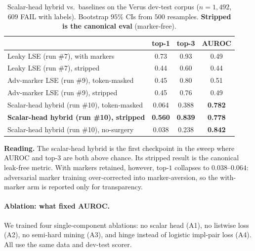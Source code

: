 \documentclass[10pt]{article}
\begin{document}
\begin{table}[htbp]
\centering
\caption{Scalar-head hybrid vs.\ baselines on the Verus dev-test corpus
($n{=}1{,}492$, $609$ FAIL with labels). Bootstrap $95\%$ CIs from
$500$ resamples. \textbf{Stripped is the canonical eval} (marker-free).}
\label{tab:run10-real-bug}
\small
\begin{tabular}{lccc}
\toprule
                                  & top-1            & top-3            & AUROC          \\
\midrule
Leaky LSE (run \#7), with markers   & 0.73             & 0.93             & 0.49           \\
Leaky LSE (run \#7), stripped      & 0.44             & 0.60             & 0.44           \\
Adv-marker LSE (run \#9), token-masked              & 0.45             & 0.80             & 0.51           \\
Adv-marker LSE (run \#9), stripped                  & 0.45             & 0.76             & 0.49           \\
\midrule
Scalar-head hybrid (run \#10), token-masked             & 0.064            & 0.388            & \textbf{0.782} \\
\textbf{Scalar-head hybrid (run \#10), stripped}        & \textbf{0.560}   & \textbf{0.839}   & \textbf{0.778} \\
Scalar-head hybrid (run \#10), no-surgery               & 0.038            & 0.238            & \textbf{0.842} \\
\bottomrule
\end{tabular}
\end{table}

\textbf{Reading.} The scalar-head hybrid is the first checkpoint in the
sweep where AUROC and top-$3$ are both above chance. Its stripped result
is the canonical leak-free metric. With markers retained, however,
top-$1$ collapses to $0.038$--$0.064$: adversarial marker training
over-corrected into marker-aversion, so the with-marker arm is reported
only for transparency.

\paragraph{Ablation: what fixed AUROC.}
We trained four single-component ablations: no scalar head (A1), no
listwise loss (A2), no semi-hard mining (A3), and hinge instead of
logistic impl-pair loss (A4). All use the same data and dev-test scorer.
\end{document}
